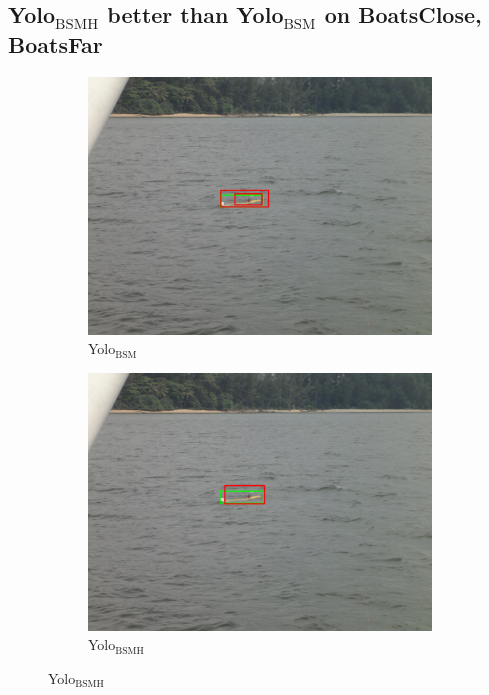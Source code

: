 \subsection{Yolo$_{\text{BSMH}}$ better than Yolo$_{\text{BSM}}$ on BoatsClose, BoatsFar}
\label{sec:3better}
\begin{figure}[h!]
\begin{subfigure}{.5\textwidth}
  \centering
  \includegraphics[width=0.9\linewidth]{results/case_buildings/yolo23/3better/yolo2/DSC02490.jpg}
  \caption{Yolo$_{\text{BSM}}$}
\end{subfigure}%
\begin{subfigure}{.5\textwidth}
  \centering
  \includegraphics[width=.9\linewidth]{results/case_buildings/yolo23/3better/yolo3/DSC02490.jpg}
  \caption{Yolo$_{\text{BSMH}}$}
\end{subfigure}


\end{figure}
